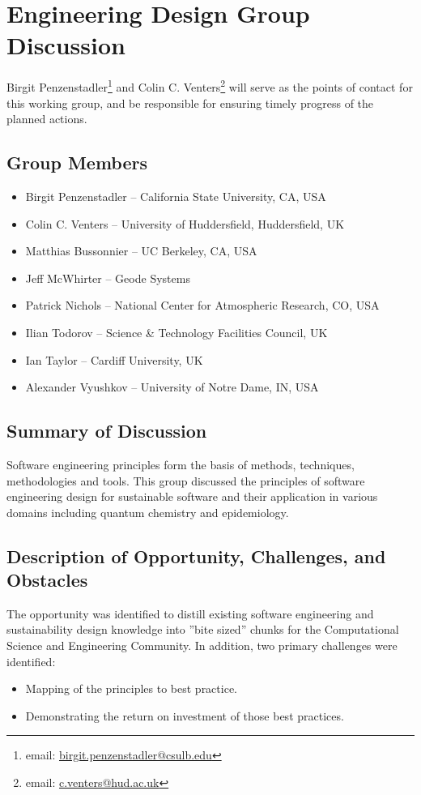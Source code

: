 \section{Engineering Design Group Discussion}
\label{sec:appendix_eng_design}

Birgit Penzenstadler\footnote{email: \href{mailto:birgit.penzenstadler@csulb.edu}{birgit.penzenstadler@csulb.edu}} and Colin C. Venters\footnote{email: \href{mailto:c.venters@hud.ac.uk}{c.venters@hud.ac.uk}} will serve as the points of contact for this working group, and be responsible for ensuring timely progress of the planned actions.

\subsection{Group Members}

\begin{itemize}
\item Birgit Penzenstadler -- California State University, CA, USA
\item Colin C. Venters -- University of Huddersfield, Huddersfield, UK
\item Matthias Bussonnier -- UC Berkeley, CA, USA
\item Jeff McWhirter -- Geode Systems 
\item Patrick Nichols -- National Center for Atmospheric Research, CO, USA
\item Ilian Todorov -- Science \& Technology Facilities Council, UK
\item Ian Taylor -- Cardiff University, UK
\item Alexander Vyushkov -- University of Notre Dame, IN, USA
\end{itemize}

\subsection{Summary of Discussion}
Software engineering principles form the basis of methods, techniques, methodologies and tools. This group discussed the principles of software engineering design for sustainable software and their application in various domains including quantum chemistry and epidemiology. 

\subsection{Description of Opportunity, Challenges, and Obstacles}
The opportunity was identified to distill existing software engineering and sustainability design knowledge into ''bite sized'' chunks for the Computational Science and Engineering Community. In addition, two primary challenges were identified:
\begin{itemize}
\item Mapping of the principles to best practice.
\item Demonstrating the return on investment of those best practices.
\end{itemize}

